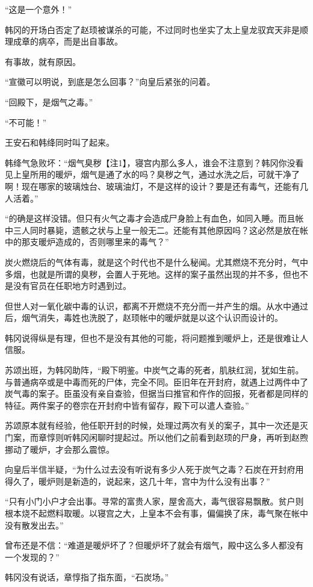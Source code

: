 “这是一个意外！”

韩冈的开场白否定了赵顼被谋杀的可能，不过同时也坐实了太上皇龙驭宾天非是顺理成章的病卒，而是出自事故。

有事故，就有原因。

“宣徽可以明说，到底是怎么回事？”向皇后紧张的问着。

“回殿下，是烟气之毒。”

“不可能！”

王安石和韩绛同时叫了起来。

韩绛气急败坏：“烟气臭秽【注1】，寝宫内那么多人，谁会不注意到？韩冈你没看见上皇所用的暖炉，烟气是通了水的吗？臭秽之气，通过水洗之后，可就干净了啊！现在哪家的玻璃烛台、玻璃油灯，不是这样的设计？要是还有毒气，还能有几人活着。”

“的确是这样没错。但只有火气之毒才会造成尸身脸上有血色，如同入睡。而且帐中三人同时暴毙，遗骸之状与上皇一般无二。还能有其他原因吗？这必然是放在帐中的那支暖炉造成的，否则哪里来的毒气？”

炭火燃烧后的气体有毒，就是这个时代也不是什么秘闻。尤其燃烧不充分时，气中多烟，也就是所谓的臭秽，会置人于死地。这样的案子虽然出现的并不多，但也不是没有官员在任职地方时遇到过。

但世人对一氧化碳中毒的认识，都离不开燃烧不充分而一并产生的烟。从水中通过后，烟气消失，毒姓也洗脱了，赵顼帐中的暖炉就是以这个认识而设计的。

韩冈说得纵是有理，但也不是没有其他的可能，将问题推到暖炉上，还是很难让人信服。

苏颂出班，为韩冈助阵，“殿下明鉴。中炭气之毒的死者，肌肤红润，犹如生前。与普通病卒或是中毒而死的尸体，完全不同。臣旧年在开封府，就遇上过两件中了炭气毒的案子。臣虽没有亲自查验，但据当曰推官和仵作的回报，死者都是同样的特征。两件案子的卷宗在开封府中皆有留存，殿下可以遣人查验。”

苏颂原本就有经验，他任职开封的时候，处理过两次有关的案子，其中一次还是灭门案，而章惇则听韩冈闲聊时提起过。所以他们之前看到赵顼的尸身，再听到赵煦挪动了暖炉，才会那么震惊。

向皇后半信半疑，“为什么过去没有听说有多少人死于炭气之毒？石炭在开封府用得久了，暖炉则是新造的，说起来，这几十年，宫中为什么没有出事？”

“只有小门小户才会出事。寻常的富贵人家，屋舍高大，毒气很容易飘散。贫户则根本烧不起燃料取暖。以寝宫之大，上皇本不会有事，偏偏换了床，毒气聚在帐中没有散发出去。”

曾布还是不信：“难道是暖炉坏了？但暖炉坏了就会有烟气，殿中这么多人都没有一个发现的？”

韩冈没有说话，章惇指了指东面，“石炭场。”

